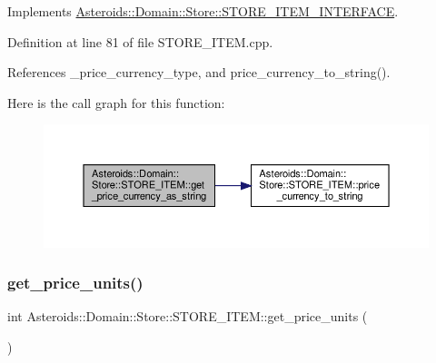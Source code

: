 Implements \hyperlink{classAsteroids_1_1Domain_1_1Store_1_1STORE__ITEM__INTERFACE_a914d5fb19a801e397953180f6b115e04}{Asteroids\+::\+Domain\+::\+Store\+::\+S\+T\+O\+R\+E\+\_\+\+I\+T\+E\+M\+\_\+\+I\+N\+T\+E\+R\+F\+A\+CE}.



Definition at line 81 of file S\+T\+O\+R\+E\+\_\+\+I\+T\+E\+M.\+cpp.



References \+\_\+price\+\_\+currency\+\_\+type, and price\+\_\+currency\+\_\+to\+\_\+string().

Here is the call graph for this function\+:\nopagebreak
\begin{figure}[H]
\begin{center}
\leavevmode
\includegraphics[width=350pt]{classAsteroids_1_1Domain_1_1Store_1_1STORE__ITEM_a55c625077b78bf51b53880a2a77a8ece_cgraph}
\end{center}
\end{figure}
\mbox{\label{classAsteroids_1_1Domain_1_1Store_1_1STORE__ITEM_ad79bef2044b0f10c7e2a08bc84a9d9f2}} 
\subsubsection{\texorpdfstring{get\+\_\+price\+\_\+units()}{get\_price\_units()}}
{\footnotesize\ttfamily int Asteroids\+::\+Domain\+::\+Store\+::\+S\+T\+O\+R\+E\+\_\+\+I\+T\+E\+M\+::get\+\_\+price\+\_\+units (\begin{DoxyParamCaption}{ }\end{DoxyParamCaption})\hspace{0.3cm}{\ttfamily [virtual]}}



